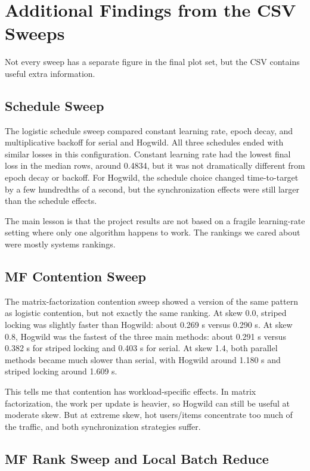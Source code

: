 \documentclass[11pt]{article}
\begin{document}
\section{Additional Findings from the CSV Sweeps}

Not every sweep has a separate figure in the final plot set, but the CSV contains useful extra information.

\subsection{Schedule Sweep}

The logistic schedule sweep compared constant learning rate, epoch decay, and multiplicative backoff for serial and Hogwild. All three schedules ended with similar losses in this configuration. Constant learning rate had the lowest final loss in the median rows, around 0.4834, but it was not dramatically different from epoch decay or backoff. For Hogwild, the schedule choice changed time-to-target by a few hundredths of a second, but the synchronization effects were still larger than the schedule effects.

The main lesson is that the project results are not based on a fragile learning-rate setting where only one algorithm happens to work. The rankings we cared about were mostly systems rankings.

\subsection{MF Contention Sweep}

The matrix-factorization contention sweep showed a version of the same pattern as logistic contention, but not exactly the same ranking. At skew 0.0, striped locking was slightly faster than Hogwild: about 0.269 s versus 0.290 s. At skew 0.8, Hogwild was the fastest of the three main methods: about 0.291 s versus 0.382 s for striped locking and 0.403 s for serial. At skew 1.4, both parallel methods became much slower than serial, with Hogwild around 1.180 s and striped locking around 1.609 s.

This tells me that contention has workload-specific effects. In matrix factorization, the work per update is heavier, so Hogwild can still be useful at moderate skew. But at extreme skew, hot users/items concentrate too much of the traffic, and both synchronization strategies suffer.

\subsection{MF Rank Sweep and Local Batch Reduce}
\end{document}
